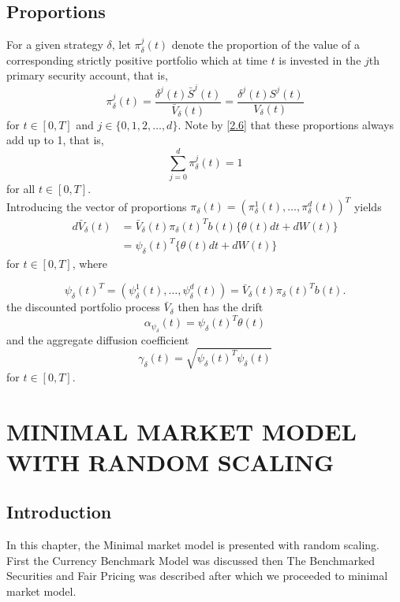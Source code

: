 \documentclass[a4 paper, 12pt]{report}
\theoremstyle{plain}
\begin{document}
\section{Proportions}
For a given strategy $\delta$, let $\pi_\delta^j(t)$ denote the proportion of the value of a corresponding strictly positive portfolio which at time $t$ is invested in the $j$th  primary security account, that is,
\begin{equation}\label{2.9}
\pi_\delta^j(t) = \frac{\delta^j(t)\bar{S}^j(t)}{\bar{V}_\delta(t)} = \frac{\delta^j(t)S^j(t)}{V_\delta(t)}
\end{equation}
for $t\in[0,T]$ and $j\in\{0,1,2,\ldots,d\}.$ Note by \eqref{2.6} that these proportions always add up to 1, that is,
$$
\sum_{j = 0}^d\pi_\delta^j(t) = 1
$$
for all $t\in[0,T]$.\\
Introducing the vector of proportions $\pi_\delta(t) = (\pi_\delta^1(t),\ldots,\pi_\delta^d(t))^T$ yields
\begin{align*}
d\bar{V}_\delta(t)& = \bar{V}_\delta(t)\pi_\delta(t)^Tb(t)\{\theta(t)dt+dW(t)\}\\
& = \psi_\delta(t)^T\{\theta(t)dt+dW(t)\}
\end{align*}
for $t\in[0,T]$, where 

$$
\psi_\delta(t)^T = (\psi^1_\delta(t),\ldots,\psi_\delta^d(t)) = \bar{V}_\delta(t)\pi_\delta(t)^Tb(t).
$$
the discounted portfolio process $\bar{V}_\delta$ then has the drift
$$
\alpha_{\psi_\delta}(t) = \psi_\delta(t)^T\theta(t)
$$
and the aggregate diffusion coefficient
$$
\gamma_\delta(t)  = \sqrt{\psi_\delta(t)^T\psi_\delta(t)}
$$
for $t\in[0,T]$.


\chapter{MINIMAL MARKET MODEL WITH RANDOM SCALING}
\section{Introduction}
\noindent
\par In this chapter, the Minimal market model is presented with random
scaling. First the Currency Benchmark Model was discussed then The
Benchmarked Securities and Fair Pricing was described after which we
proceeded to minimal market model.\\
\end{document}
